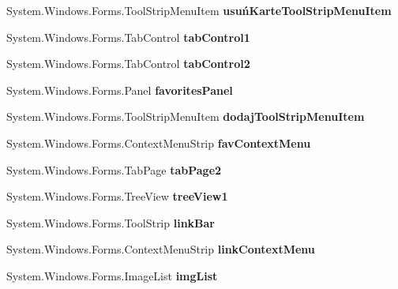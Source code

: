 \begin{DoxyCompactItemize}
\item 
\mbox{\label{class_windows_forms_app2_1_1_przegladarka_a57bf4cc0dbb4b2cb91cd72013b7e69ca}} 
System.\+Windows.\+Forms.\+Tool\+Strip\+Menu\+Item {\bfseries usuń\+Karte\+Tool\+Strip\+Menu\+Item}
\item 
\mbox{\label{class_windows_forms_app2_1_1_przegladarka_ad7aa576ee790c104bf466d5609e5b4be}} 
System.\+Windows.\+Forms.\+Tab\+Control {\bfseries tab\+Control1}
\item 
\mbox{\label{class_windows_forms_app2_1_1_przegladarka_ad3a5df3b81ffdc3098dcc527b4e4bcc2}} 
System.\+Windows.\+Forms.\+Tab\+Control {\bfseries tab\+Control2}
\item 
\mbox{\label{class_windows_forms_app2_1_1_przegladarka_a9f4f2dd866a9feaaf7dc9485c19cfe75}} 
System.\+Windows.\+Forms.\+Panel {\bfseries favorites\+Panel}
\item 
\mbox{\label{class_windows_forms_app2_1_1_przegladarka_a5d68cce2771648ea7792cd0c9c9adea0}} 
System.\+Windows.\+Forms.\+Tool\+Strip\+Menu\+Item {\bfseries dodaj\+Tool\+Strip\+Menu\+Item}
\item 
\mbox{\label{class_windows_forms_app2_1_1_przegladarka_a06f7e91f44509f310e084393ad82b2e3}} 
System.\+Windows.\+Forms.\+Context\+Menu\+Strip {\bfseries fav\+Context\+Menu}
\item 
\mbox{\label{class_windows_forms_app2_1_1_przegladarka_ae3fff43a3e2a7dda4a7841f079a60fd4}} 
System.\+Windows.\+Forms.\+Tab\+Page {\bfseries tab\+Page2}
\item 
\mbox{\label{class_windows_forms_app2_1_1_przegladarka_a8f1855a5829eecb2c52be4d086b2d546}} 
System.\+Windows.\+Forms.\+Tree\+View {\bfseries tree\+View1}
\item 
\mbox{\label{class_windows_forms_app2_1_1_przegladarka_ab7162215196c1e2ea01bb2e1e7678484}} 
System.\+Windows.\+Forms.\+Tool\+Strip {\bfseries link\+Bar}
\item 
\mbox{\label{class_windows_forms_app2_1_1_przegladarka_a58d094443f963458b2a8e5e3e5162d5f}} 
System.\+Windows.\+Forms.\+Context\+Menu\+Strip {\bfseries link\+Context\+Menu}
\item 
\mbox{\label{class_windows_forms_app2_1_1_przegladarka_a993a0596a743eccff0a5a6e487821bcd}} 
System.\+Windows.\+Forms.\+Image\+List {\bfseries img\+List}
\end{DoxyCompactItemize}
